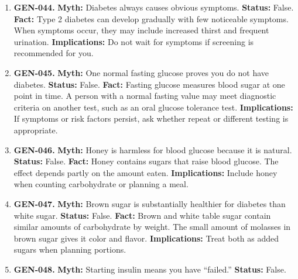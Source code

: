 \documentclass[11pt,oneside]{book}
\begin{document}
\begin{enumerate}[leftmargin=0pt,labelwidth=0pt,labelsep=0pt,itemindent=0pt]
\textbf{Implications:} Discuss testing if you have symptoms or risk factors, whatever your weight.
\item[] \textbf{GEN-044.} \textbf{Myth:} Diabetes always causes obvious symptoms.\newline
\textbf{Status:} False.\newline
\textbf{Fact:} Type 2 diabetes can develop gradually with few noticeable symptoms. When symptoms occur, they may include increased thirst and frequent urination. \cite{ref173}\newline
\textbf{Implications:} Do not wait for symptoms if screening is recommended for you.
\item[] \textbf{GEN-045.} \textbf{Myth:} One normal fasting glucose proves you do not have diabetes.\newline
\textbf{Status:} False.\newline
\textbf{Fact:} Fasting glucose measures blood sugar at one point in time. A person with a normal fasting value may meet diagnostic criteria on another test, such as an oral glucose tolerance test. \cite{ref300}\newline
\textbf{Implications:} If symptoms or risk factors persist, ask whether repeat or different testing is appropriate.
\item[] \textbf{GEN-046.} \textbf{Myth:} Honey is harmless for blood glucose because it is natural.\newline
\textbf{Status:} False.\newline
\textbf{Fact:} Honey contains sugars that raise blood glucose. The effect depends partly on the amount eaten. \cite{ref173}\newline
\textbf{Implications:} Include honey when counting carbohydrate or planning a meal.
\item[] \textbf{GEN-047.} \textbf{Myth:} Brown sugar is substantially healthier for diabetes than white sugar.\newline
\textbf{Status:} False.\newline
\textbf{Fact:} Brown and white table sugar contain similar amounts of carbohydrate by weight. The small amount of molasses in brown sugar gives it color and flavor. \cite{ref173}\newline
\textbf{Implications:} Treat both as added sugars when planning portions.
\item[] \textbf{GEN-048.} \textbf{Myth:} Starting insulin means you have ``failed.''\newline
\textbf{Status:} False.\newline

\end{enumerate}
\end{document}
